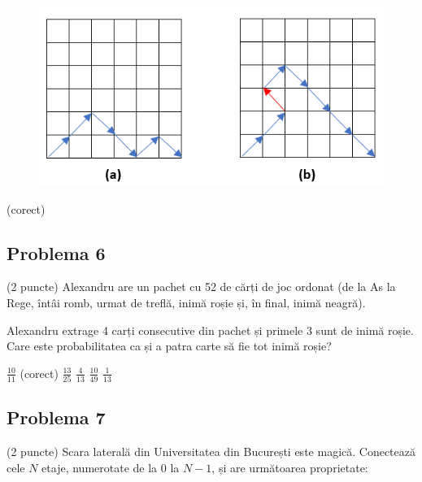 \documentclass{exam}
\begin{document}
\begin{figure}[h]
\includegraphics[scale=1]{trasee.png}
\centering
\end{figure}

\begin{oneparchoices}
  (corect)
\end{oneparchoices}

\subsection*{Problema 6}

(2 puncte) Alexandru are un pachet cu 52 de cărți de joc ordonat (de la As la Rege, întâi romb, urmat de treflă, inimă roșie și, în final, inimă neagră).

Alexandru extrage 4 carți consecutive din pachet și primele 3 sunt de inimă roșie. Care este probabilitatea ca și a patra carte să fie tot inimă roșie?


\begin{oneparchoices}
 \choice $\frac{10}{11}$ (corect)
 \choice $\frac{13}{25}$
 \choice $\frac{4}{13}$
 \choice $\frac{10}{49}$
 \choice $\frac{1}{13}$
\end{oneparchoices}


\subsection*{Problema 7}

(2 puncte) Scara laterală din Universitatea din București este magică. Conectează cele $N$ etaje, numerotate de la $0$ la $N - 1$, și are următoarea proprietate:
\end{document}
